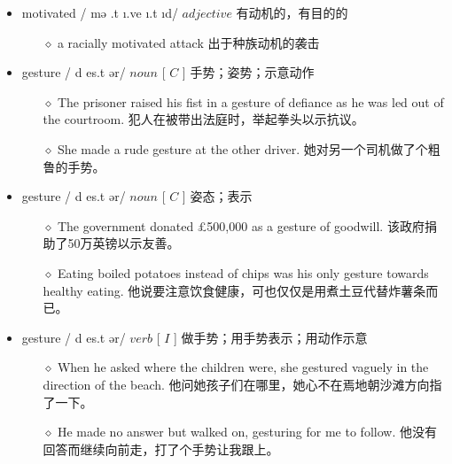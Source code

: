 \documentclass[a4paper,top=2.5cm,buttom=2.5cm10.5pt]{book}
\begin{document}
\begin{itemize}
\item motivated / \textprimstress mə \textupsilon .t \i .ve \i .t \i d/ $ adjective $  有动机的，有目的的
\begin{itemize}
\item[$\diamond$] a racially motivated attack
出于种族动机的袭击
\end{itemize}
\end{itemize}
\begin{itemize}
\item gesture / \textprimstress d \textyogh es.t \textesh ər/ $ noun $ [  $ C $  ] 手势；姿势；示意动作
\begin{itemize}
\item[$\diamond$] The prisoner raised his fist in a gesture of defiance as he was led out of the courtroom.
犯人在被带出法庭时，举起拳头以示抗议。
\item[$\diamond$] She made a rude gesture at the other driver.
她对另一个司机做了个粗鲁的手势。
\end{itemize}
\end{itemize}
\begin{itemize}
\item gesture / \textprimstress d \textyogh es.t \textesh ər/ $ noun $ [  $ C $  ] 姿态；表示
\begin{itemize}
\item[$\diamond$] The government donated £500,000 as a gesture of goodwill.
该政府捐助了50万英镑以示友善。
\item[$\diamond$] Eating boiled potatoes instead of chips was his only gesture towards healthy eating.
他说要注意饮食健康，可也仅仅是用煮土豆代替炸薯条而已。
\end{itemize}
\end{itemize}
\begin{itemize}
\item gesture / \textprimstress d \textyogh es.t \textesh ər/ $ verb $ [  $ I $  ] 做手势；用手势表示；用动作示意
\begin{itemize}
\item[$\diamond$] When he asked where the children were, she gestured vaguely in the direction of the beach.
他问她孩子们在哪里，她心不在焉地朝沙滩方向指了一下。
\item[$\diamond$] He made no answer but walked on, gesturing for me to follow.
他没有回答而继续向前走，打了个手势让我跟上。
\end{itemize}
\end{itemize}
\end{document}
